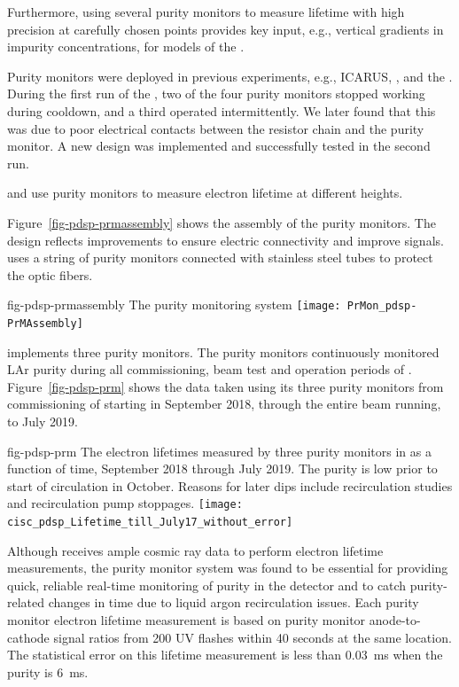 Furthermore, using several purity monitors to measure lifetime with high precision at carefully chosen points provides key input, e.g.,  vertical gradients in impurity concentrations, for  models of the .

Purity monitors were deployed in previous  experiments, e.g., ICARUS, \microboone, and the . During the first run of the , two of the four purity monitors stopped working during cooldown, and a third operated intermittently. We later found that this was due to poor electrical contacts between the resistor chain and the purity monitor. A new design was implemented and successfully tested in the second run. 


 and  %
use purity monitors to %
measure electron lifetime at different heights. 

Figure~\ref{fig-pdsp-prmassembly} shows the assembly of the  purity monitors. The design reflects improvements to ensure electric connectivity and improve signals.  uses a string of purity monitors connected with stainless steel tubes to protect the optic fibers. 
\begin{dunefigure}{fig-pdsp-prmassembly}
  {The  purity monitoring system}
  \texttt{[image: PrMon\_pdsp-PrMAssembly]}
\end{dunefigure}


 implements three purity monitors. The purity monitors continuously monitored LAr purity during all commissioning, beam test and operation periods of . Figure~\ref{fig-pdsp-prm} shows the  data taken using %
its three purity monitors from commissioning of  starting in September 2018, through the entire beam running, to July 2019.

\begin{dunefigure}{fig-pdsp-prm}
  {The electron lifetimes measured by three purity monitors in  as a function of time, September 2018 through July 2019. The purity is low prior to start of circulation in October. Reasons for later dips include recirculation studies and recirculation pump stoppages.}
  \texttt{[image: cisc\_pdsp\_Lifetime\_till\_July17\_without\_error]}
\end{dunefigure}

Although  receives ample cosmic ray data to perform electron lifetime measurements, the purity monitor system was found to be essential for providing quick, reliable real-time monitoring of purity in the detector and to catch purity-related changes in time due to liquid argon recirculation issues. 
Each purity monitor electron lifetime measurement is based on purity monitor anode-to-cathode signal ratios from 200 UV flashes within 40 seconds at the same location. The statistical error on this lifetime measurement is less than \SI{0.03}{ms} when the purity is \SI{6}{ms}. 


